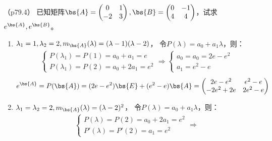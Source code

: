 \documentclass[12pt, a4paper, oneside, UTF8]{ctexbook}
\begin{document}
\begin{question}（p79.4）
    已知矩阵$\bs{A}=\begin{pmatrix}
        0 & 1 \\
        -2 & 3
    \end{pmatrix},\bs{B}=\begin{pmatrix}
        0 & -1 \\
        4 & 4
    \end{pmatrix}$，试求$e^{\bs{A}},e^{\bs{B}}$。
\end{question}

\begin{solution}
    \begin{enumerate}[label=(\arabic*)]
        \item $\lambda_1=1,\lambda_2=2,m_{\bs{A}}(\lambda)=(\lambda-1)(\lambda-2)$，
        令$P(\lambda)=a_0+a_1\lambda$，则：
        \begin{align*}
            \left\{
                \begin{array}{ll}
                    P(\lambda_1)=P(1)=a_0+a_1=e\\
                    P(\lambda_1)=P(2)=a_0+2a_1=e^2
                \end{array}
                \right.
                \Rightarrow
                \left\{
                    \begin{array}{ll}
                        a_0=a_0=2e-e^2\\
                        a_1=e^2-e
                    \end{array}
                    \right.    
        \end{align*}
    \begin{align*}
        e^{\bs{A}}=P(\bs{A})
    =(2e-e^2)\bs{E}+(e^2-e)\bs{A}
    =\begin{pmatrix}
        2e-e^2 &e^2-e \\
        -2e^2+2e & 2e^2-e
    \end{pmatrix}
    \end{align*}
    \item $\lambda_1=\lambda_2=2,m_{\bs{A}}(\lambda)=(\lambda-2)^2$，
    令$P(\lambda)=a_0+a_1\lambda$，则：
    \begin{align*}
        \left\{
            \begin{array}{ll}
                P(\lambda)=P(2)=a_0+2a_1=e^2\\
                P'(\lambda)=P'(2)=a_1=e^2
            \end{array}
            \right.
            \Rightarrow

\end{align*}
\end{enumerate}
\end{solution}
\end{document}
